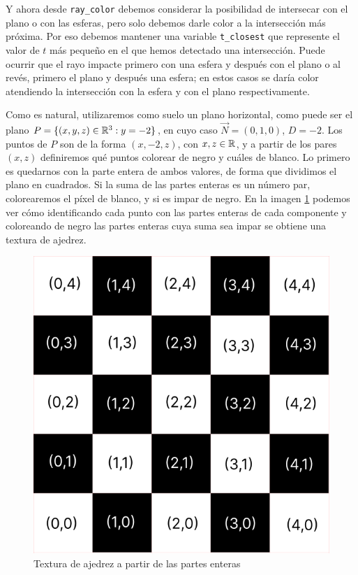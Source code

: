 Y ahora desde \verb|ray_color| debemos considerar la posibilidad de intersecar con el plano o con las esferas, pero solo debemos darle color a la intersección más próxima. Por eso debemos mantener una variable \verb|t_closest| que represente el valor de $t$ más pequeño en el que hemos detectado una intersección. Puede ocurrir que el rayo impacte primero con una esfera y después con el plano o al revés, primero el plano y después una esfera; en estos casos se daría color atendiendo la intersección con la esfera y con el plano respectivamente. 

Como es natural, utilizaremos como suelo un plano horizontal, como puede ser el plano $P=\{(x,y,z)\in\mathbb{R}^3:y=-2\}$, en cuyo caso $\vec N=(0,1,0)$, $D=-2$. Los puntos de $P$ son de la forma $(x,-2,z)$, con $ x,z\in\mathbb{R}$, y a partir de los pares $(x,z)$ definiremos qué puntos colorear de negro y cuáles de blanco. Lo primero es quedarnos con la parte entera de ambos valores, de forma que dividimos el plano en cuadrados. Si la suma de las partes enteras es un número par, colorearemos el píxel de blanco, y si es impar de negro. En la imagen \ref{fig:ajedrez} podemos ver cómo identificando cada punto con las partes enteras de cada componente y coloreando de negro las partes enteras cuya suma sea impar se obtiene una textura de ajedrez.

\begin{figure} [ht]
    \centering
    \includegraphics[scale = 0.25]{img/C7/ajedrez.png}
    \caption{Textura de ajedrez a partir de las partes enteras}
    \label{fig:ajedrez}
\end{figure}

